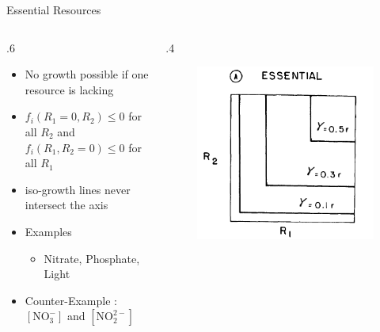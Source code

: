 \documentclass[final,xcolor=dvipsnames]{beamer}
\begin{document}
\begin{frame}[allowframebreaks]{Essential Resources}
\begin{columns}
  \begin{column}{.6\framewidth}
   \begin{itemize}
   \item No growth possible if one resource is lacking
   \item $f_i(R_1=0,R_2)\leq 0$ for all $R_2$ and $f_i(R_1,R_2=0)\leq 0$ for all $R_1$
   \item iso-growth lines never intersect the axis
   \item Examples
   \begin{itemize}
   \item Nitrate, Phosphate, Light
    \end{itemize}
   \item Counter-Example : $[\mathrm{NO_3^{-}}]$ and $[\mathrm{NO_2^{2-}}]$
   \end{itemize}
  \end{column}
  \begin{column}{.4\framewidth}
    \begin{figure}
       \includegraphics[width=.4\framewidth]{Essential1}
    \end{figure}
  \end{column}
 \end{columns}

 \framebreak



\end{frame}
\end{document}
